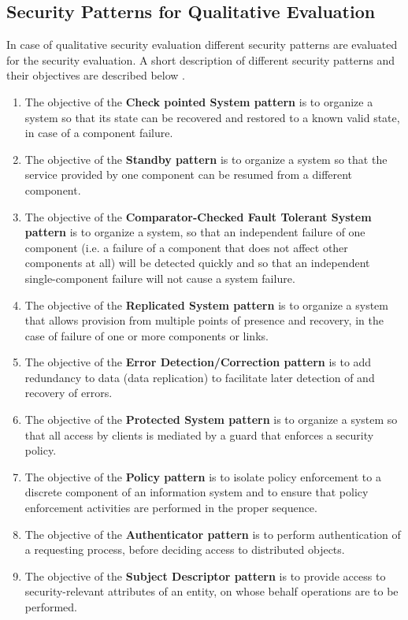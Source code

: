 \documentclass[pdftex,english,oribibl]{llncs}
\begin{document}
\subsection{Security Patterns for Qualitative Evaluation}
In case of qualitative security evaluation different security patterns are evaluated for the security evaluation.  A short description of different security patterns and their objectives are described below \cite{HALKIDIS2006379}.
\begin{enumerate}[(1)]
	\item{The objective of the \textbf{Check pointed System pattern} is to organize a system so that its state can be recovered and restored to a known valid state, in case of a component failure.}
	\item{The objective of the \textbf{Standby pattern} is to organize a system so that the service provided by one component can be resumed from a different component.}
	\item{The objective of the \textbf{Comparator-Checked Fault Tolerant System pattern} is to organize a system, so that an independent failure of one component (i.e. a failure of a component that does not affect other components at all) will be detected quickly and so that an independent single-component failure will not cause a system failure.}
	\item {The objective of the \textbf{Replicated System pattern} is to organize a system that allows provision from multiple points of presence and recovery, in the case of failure of one or more components or links.}
	\item {The objective of the \textbf{Error Detection/Correction pattern} is to add redundancy to data (data replication) to facilitate later detection of and recovery of errors.}
	\item {The objective of the\textbf{ Protected System pattern} is to organize a system so that all access by clients is mediated by a guard that enforces a security policy.}
	\item{The objective of the \textbf{Policy pattern} is to isolate policy enforcement to a discrete component of an information system and to ensure that policy enforcement activities are performed in the proper sequence.}
	\item{The objective of the \textbf{Authenticator pattern} is to perform authentication of a requesting process, before deciding access to distributed objects.}
	\item{The objective of the \textbf{Subject Descriptor pattern} is to provide access to security-relevant attributes of an entity, on whose behalf operations are to be performed.}

\end{enumerate}
\end{document}
